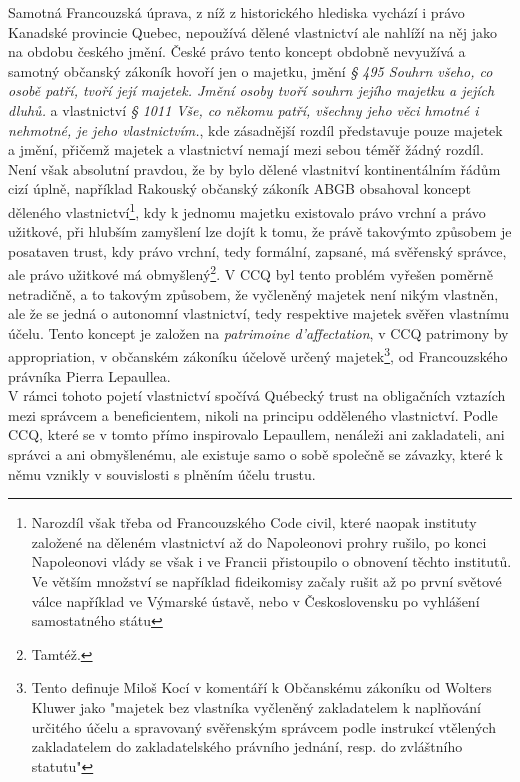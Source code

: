 \documentclass{article}
\begin{document}
Samotná Francouzská úprava, z níž z historického hlediska vychází i právo Kanadské provincie Quebec, nepoužívá dělené vlastnictví ale nahlíží na něj jako na obdobu českého jmění. České právo tento koncept obdobně nevyužívá a samotný občanský zákoník hovoří jen o majetku, jmění \textit{§ 495 Souhrn všeho, co osobě patří, tvoří její majetek. Jmění osoby tvoří souhrn jejího majetku a jejích dluhů.} a vlastnictví \textit{§ 1011 Vše, co někomu patří, všechny jeho věci hmotné i nehmotné, je jeho vlastnictvím.}, kde zásadnější rozdíl představuje pouze majetek a jmění, přičemž majetek a vlastnictví nemají mezi sebou téměř žádný rozdíl.\\

Není však absolutní pravdou, že by bylo dělené vlastnitví kontinentálním řádům cizí úplně, například Rakouský občanský zákoník ABGB obsahoval koncept děleného vlastnictví\footnote{Narozdíl však třeba od Francouzského Code civil, které naopak instituty založené na děleném vlastnictví až do Napoleonovi prohry rušilo, po konci Napoleonovi vlády se však i ve Francii přistoupilo o obnovení těchto institutů. Ve větším množství se například fideikomisy začaly rušit až po první světové válce například ve Výmarské ústavě, nebo v Československu po vyhlášení samostatného státu}, kdy k jednomu majetku existovalo právo vrchní a právo užitkové, při hlubším zamyšlení lze dojít k tomu, že právě takovýmto způsobem je posataven trust, kdy právo vrchní, tedy formální, zapsané, má svěřenský správce, ale právo užitkové má obmyšlený\footnote{Tamtéž.}. V CCQ byl tento problém vyřešen poměrně netradičně, a to takovým způsobem, že vyčleněný majetek není nikým vlastněn, ale že se jedná o autonomní vlastnictví, tedy respektive majetek svěřen vlastnímu účelu. Tento koncept je založen na \textit{patrimoine d'affectation}, v CCQ patrimony by appropriation, v občanském zákoníku účelově určený majetek\footnote{Tento definuje Miloš Kocí v komentáří k Občanskému zákoníku od Wolters Kluwer jako "majetek bez vlastníka vyčleněný zakladatelem k naplňování určitého účelu a spravovaný svěřenským správcem podle instrukcí vtělených zakladatelem do zakladatelského právního jednání, resp. do zvláštního statutu"}, od Francouzského právníka Pierra Lepaullea.\\ 

V rámci tohoto pojetí vlastnictví spočívá Québecký trust na obligačních vztazích mezi správcem a beneficientem, nikoli na principu odděleného vlastnictví. Podle CCQ, které se v tomto přímo inspirovalo Lepaullem, nenáleži ani zakladateli, ani správci a ani obmyšlenému, ale existuje samo o sobě společně se závazky, které k němu vznikly v souvislosti s plněním účelu trustu.\\
\end{document}
